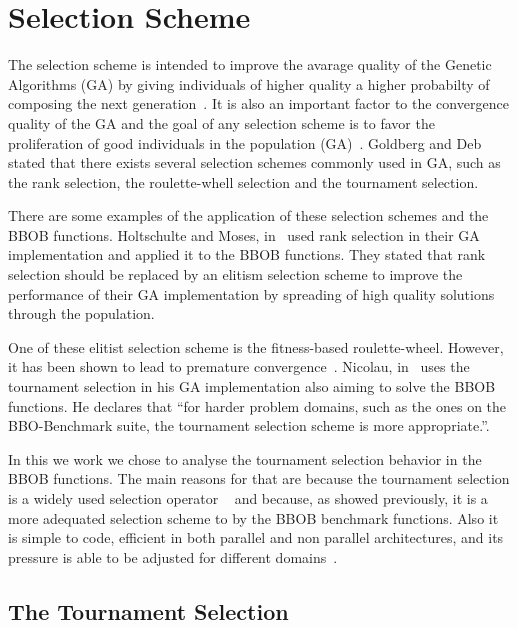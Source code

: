 \section{Selection Scheme}\label{sec:background:Selection Scheme} 

The selection scheme is intended to improve the avarage quality of the Genetic Algorithms (GA) by giving individuals of higher quality a higher probabilty of composing the next generation~\cite{blickle1995mathematical}. It is also an important factor to the convergence quality of the GA and the goal of any selection scheme is to favor the proliferation of good individuals in the population (GA)~\cite{harik1999gambler}. Goldberg and Deb~\cite{goldberg1991comparative} stated that there exists several selection schemes commonly used in GA, such as the rank selection, the roulette-whell selection and the tournament selection. 

There are some examples of the application of these selection schemes and the BBOB functions. Holtschulte and Moses, in~\cite{holtschulte2013benchmarking} used rank selection in their GA implementation and applied it to the BBOB functions. They stated that rank selection should be replaced by an elitism selection scheme to improve the performance of their GA implementation by spreading of high quality solutions through the population. 

One of these elitist selection scheme is the fitness-based roulette-wheel. However, it has been shown to lead to premature convergence~\cite{baker1987reducing}. Nicolau, in~\cite{nicolau2009application} uses the tournament selection in his GA implementation also aiming to solve the BBOB functions. He declares that ``for harder problem domains, such as the ones on the BBO-Benchmark suite, the tournament selection scheme is more appropriate.''.

In this we work we chose to analyse the tournament selection behavior in the BBOB functions. The main reasons for that are because the tournament selection is a widely used selection operator ~\cite{harik1999gambler, sawyerr2011comparative, kaelo2007integrated} and because, as showed previously, it is a more adequated selection scheme to by the BBOB benchmark functions. Also it is simple to code, efficient in both parallel and non parallel architectures, and its pressure is able to be adjusted for different domains~\cite{miller1995genetic}.



\subsection{The Tournament Selection}\label{sec:background:tournament_selection} 

